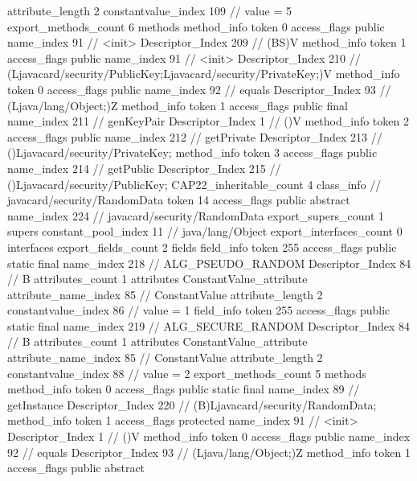 {{{{{{{					attribute_length	2
					constantvalue_index	109		// value = 5
				}
				}
			}
			}
			export_methods_count	6
			methods {
				method_info {
					token	0
					access_flags	public
					name_index	91		// <init>
					Descriptor_Index	209		// (BS)V
				}
				method_info {
					token	1
					access_flags	public
					name_index	91		// <init>
					Descriptor_Index	210		// (Ljavacard/security/PublicKey;Ljavacard/security/PrivateKey;)V
				}
				method_info {
					token	0
					access_flags	public
					name_index	92		// equals
					Descriptor_Index	93		// (Ljava/lang/Object;)Z
				}
				method_info {
					token	1
					access_flags	public final
					name_index	211		// genKeyPair
					Descriptor_Index	1		// ()V
				}
				method_info {
					token	2
					access_flags	public
					name_index	212		// getPrivate
					Descriptor_Index	213		// ()Ljavacard/security/PrivateKey;
				}
				method_info {
					token	3
					access_flags	public
					name_index	214		// getPublic
					Descriptor_Index	215		// ()Ljavacard/security/PublicKey;
				}
			}
			CAP22_inheritable_count	4
		}
		class_info {		// javacard/security/RandomData
			token	14
			access_flags	public abstract
			name_index	224		// javacard/security/RandomData
			export_supers_count	1
			supers {
				constant_pool_index	11		// java/lang/Object
			}
			export_interfaces_count	0
			interfaces {
			}
			export_fields_count	2
			fields {
			field_info {
				token	255
				access_flags	public static final
				name_index	218		// ALG_PSEUDO_RANDOM
				Descriptor_Index	84		// B
				attributes_count	1
				attributes {
				ConstantValue_attribute {
					attribute_name_index	85		// ConstantValue
					attribute_length	2
					constantvalue_index	86		// value = 1
				}
				}
			}
			field_info {
				token	255
				access_flags	public static final
				name_index	219		// ALG_SECURE_RANDOM
				Descriptor_Index	84		// B
				attributes_count	1
				attributes {
				ConstantValue_attribute {
					attribute_name_index	85		// ConstantValue
					attribute_length	2
					constantvalue_index	88		// value = 2
				}
				}
			}
			}
			export_methods_count	5
			methods {
				method_info {
					token	0
					access_flags	public static final
					name_index	89		// getInstance
					Descriptor_Index	220		// (B)Ljavacard/security/RandomData;
				}
				method_info {
					token	1
					access_flags	protected
					name_index	91		// <init>
					Descriptor_Index	1		// ()V
				}
				method_info {
					token	0
					access_flags	public
					name_index	92		// equals
					Descriptor_Index	93		// (Ljava/lang/Object;)Z
				}
				method_info {
					token	1
					access_flags	public abstract
}}}}}
